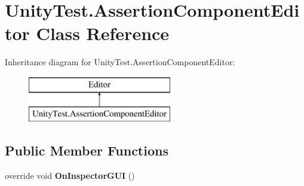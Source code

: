 \hypertarget{class_unity_test_1_1_assertion_component_editor}{}\section{Unity\+Test.\+Assertion\+Component\+Editor Class Reference}
\label{class_unity_test_1_1_assertion_component_editor}
Inheritance diagram for Unity\+Test.\+Assertion\+Component\+Editor\+:\begin{figure}[H]
\begin{center}
\leavevmode
\includegraphics[height=2.000000cm]{class_unity_test_1_1_assertion_component_editor}
\end{center}
\end{figure}
\subsection*{Public Member Functions}
\begin{DoxyCompactItemize}
\item 
\mbox{\label{class_unity_test_1_1_assertion_component_editor_a39b179ef8c8b40647d35fd6a66586579}} 
override void {\bfseries On\+Inspector\+G\+UI} ()
\end{DoxyCompactItemize}
